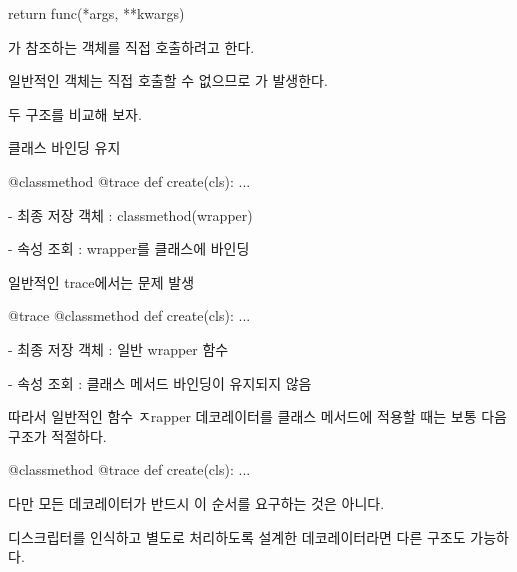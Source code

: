\begin{dhkcode}
return func(*args, **kwargs)
\end{dhkcode}

가 참조하는  객체를 직접 호출하려고 한다.

일반적인  객체는 직접 호출할 수 없으므로 가 발생한다.

두 구조를 비교해 보자.

\begin{dhknote}
\begin{dhksmry}[centered]
클래스 바인딩 유지
\end{dhksmry}
\end{dhknote}

\begin{dhkcode}
@classmethod
@trace
def create(cls):
    ...
\end{dhkcode}

\begin{dhksmry}
    - 최종 저장 객체 : classmethod(wrapper)

    - 속성 조회 : wrapper를 클래스에 바인딩
\end{dhksmry}

\begin{dhknote}
\begin{dhksmry}[centered]
일반적인 trace에서는 문제 발생
\end{dhksmry}
\end{dhknote}

\begin{dhkcode}
@trace
@classmethod
def create(cls):
    ...
\end{dhkcode}

\begin{dhksmry}
    - 최종 저장 객체 : 일반 wrapper 함수

    - 속성 조회 : 클래스 메서드 바인딩이 유지되지 않음
\end{dhksmry}

따라서 일반적인 함수 ㅈrapper 데코레이터를 클래스 메서드에 적용할 때는 보통 다음 구조가 적절하다.

\begin{dhkcode}
@classmethod
@trace
def create(cls):
    ...
\end{dhkcode}

다만 모든 데코레이터가 반드시 이 순서를 요구하는 것은 아니다.

 디스크립터를 인식하고 별도로 처리하도록 설계한 데코레이터라면 다른 구조도 가능하다.

